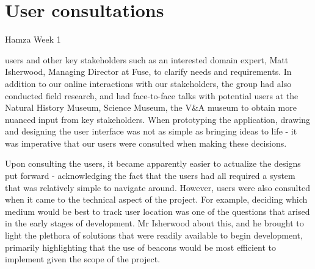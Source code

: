 \section{User consultations}
Hamza Week 1

 users and other key stakeholders such as an interested domain expert, Matt Isherwood, Managing Director at Fuse\textsuperscript{\textcopyright},  to clarify  needs and requirements. In addition to our  online interactions with our stakeholders, the group had also conducted field research, and had face-to-face talks with potential users at  the Natural History Museum, Science Museum,  the V\&A museum \remove{)} to obtain  more nuanced input from key stakeholders. When prototyping the application, drawing and designing the user interface was not as simple as bringing ideas to life - it was imperative that our users were consulted when making these decisions. 

Upon consulting the users, it became apparently easier to actualize the designs put forward - acknowledging the fact that the users had all required a system that was relatively simple to navigate around. However, users were also consulted when it came to the technical aspect of the project. For example, deciding which medium would be best to track user location was one of the questions that arised in the early stages of development.   Mr Isherwood  about this, and he  brought to light the plethora of solutions that were readily available to begin development, primarily highlighting that the use of  beacons would be most efficient to implement given the scope of the project.  